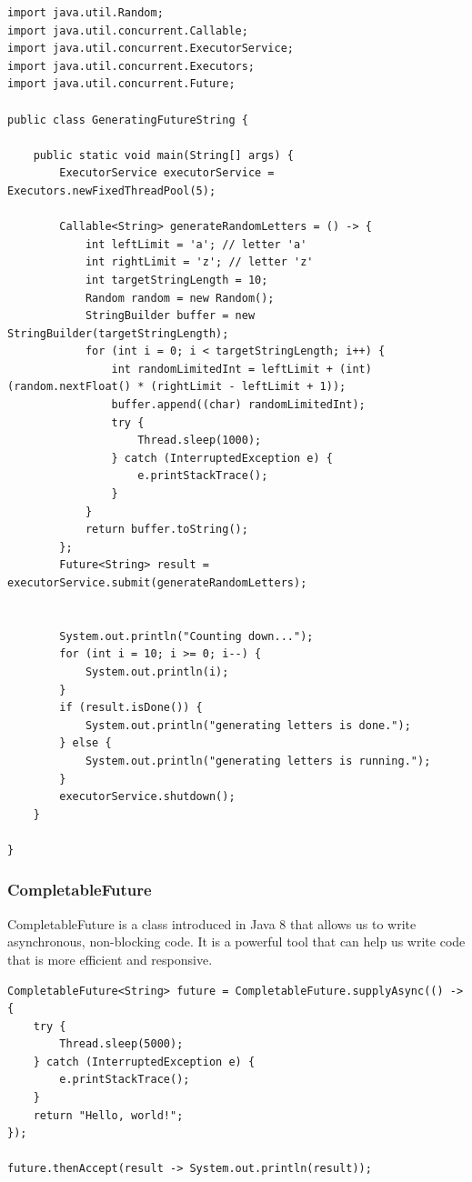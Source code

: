 \begin{lstlisting}
import java.util.Random;
import java.util.concurrent.Callable;
import java.util.concurrent.ExecutorService;
import java.util.concurrent.Executors;
import java.util.concurrent.Future;

public class GeneratingFutureString {

	public static void main(String[] args) {
		ExecutorService executorService = Executors.newFixedThreadPool(5);

		Callable<String> generateRandomLetters = () -> {
			int leftLimit = 'a'; // letter 'a'
			int rightLimit = 'z'; // letter 'z'
			int targetStringLength = 10;
			Random random = new Random();
			StringBuilder buffer = new StringBuilder(targetStringLength);
			for (int i = 0; i < targetStringLength; i++) {
				int randomLimitedInt = leftLimit + (int) (random.nextFloat() * (rightLimit - leftLimit + 1));
				buffer.append((char) randomLimitedInt);
				try {
					Thread.sleep(1000);
				} catch (InterruptedException e) {
					e.printStackTrace();
				}
			}
			return buffer.toString();
		};
		Future<String> result = executorService.submit(generateRandomLetters);


		System.out.println("Counting down...");
		for (int i = 10; i >= 0; i--) {
			System.out.println(i);
		}
		if (result.isDone()) {
			System.out.println("generating letters is done.");
		} else {
			System.out.println("generating letters is running.");
		}
		executorService.shutdown();
	}

}
\end{lstlisting}

\subsubsection{CompletableFuture}

CompletableFuture is a class introduced in Java 8 that allows us to write asynchronous, non-blocking code. It is a powerful tool that can help us write code that is more efficient and responsive.

\begin{lstlisting}
CompletableFuture<String> future = CompletableFuture.supplyAsync(() -> {
    try {
        Thread.sleep(5000);
    } catch (InterruptedException e) {
        e.printStackTrace();
    }
    return "Hello, world!";
});

future.thenAccept(result -> System.out.println(result));
\end{lstlisting}


